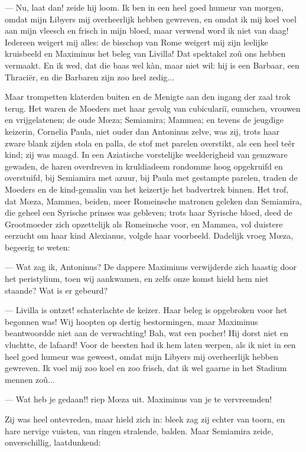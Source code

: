 \documentclass[a4paper, 12pt, oneside, dutch]{article}
\begin{document}
--- Nu, laat dan! zeide hij loom. Ik ben in een heel goed humeur van morgen, omdat mijn Libyers mij overheerlijk hebben gewreven, en omdat ik mij koel voel aan mijn vleesch en frisch in mijn bloed, maar verwend word ik niet van daag! Iedereen weigert mij alles: de bisschop van Rome weigert mij zijn leelijke kruisbeeld en Maximinus het beleg van Livilla! Dat spektakel zoû ons hebben vermaakt. En ik wed, dat die baas wel kàn, maar niet wil: hij is een Barbaar, een Thraciër, en die Barbaren zijn zoo heel zedig...

Maar trompetten klaterden buiten en de Menigte aan den ingang der zaal trok terug. Het waren de Moeders met haar gevolg van cubiculariï, eunuchen, vrouwen en vrijgelatenen; de oude Mœza; Semiamira; Mammea; en tevens de jeugdige keizerin, Cornelia Paula, niet ouder dan Antoninus zelve, was zij, trots haar zware blank zijden stola en palla, de stof met parelen overstikt, als een heel teêr kind; zij was maagd. In een Aziatische vorstelijke weelderigheid van gemzware gewaden, de haren overdreven in kruldiadeem rondomme hoog opgekruifd en overstuifd, bij Semiamira met azuur, bij Paula met gestampte parelen, traden de Moeders en de kind-gemalin van het keizertje het badvertrek binnen. Het trof, dat Mœza, Mammea, beiden, meer Romeinsche matronen geleken dan Semiamira, die geheel een Syrische prinses was gebleven; trots haar Syrische bloed, deed de Grootmoeder zich opzettelijk als Romeinsche voor, en Mammea, vol duistere eerzucht om haar kind Alexianus, volgde haar voorbeeld. Dadelijk vroeg Mœza, begeerig te weten:

--- Wat zag ik, Antoninus? De dappere Maximinus verwijderde zich haastig door het peristylium, toen wij aankwamen, en zelfs onze komst hield hem niet staande? Wat is er gebeurd?

--- Livilla is ontzet! schaterlachte de keizer. Haar beleg is opgebroken voor het begonnen was! Wij hoopten op dertig bestormingen, maar Maximinus beantwoordde niet aan de verwachting! Bah, wat een pocher! Hij dorst niet en vluchtte, de lafaard! Voor de beesten had ik hem laten werpen, als ik niet in een heel goed humeur was geweest, omdat mijn Libyers mij overheerlijk hebben gewreven. Ik voel mij zoo koel en zoo frisch, dat ik wel gaarne in het Stadium mennen zoû...

--- Wat heb je gedaan!! riep Mœza uit. Maximinus van je te vervreemden!

Zij was heel ontevreden, maar hield zich in: bleek zag zij echter van toorn, en hare nervige vuisten, van ringen stralende, balden. Maar Semiamira zeide, onverschillig, laatdunkend:
\end{document}
